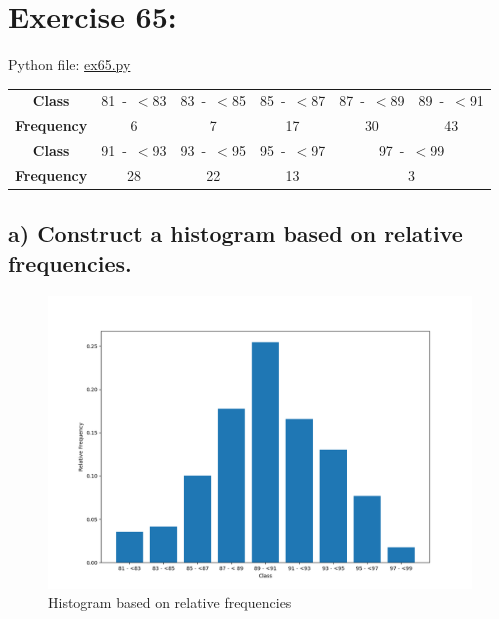 \newpage
\section{Exercise 65:}

Python file: \href{file:./python-scripts/ex65.py}{ex65.py}

\begin{table}[h!]
    \centering
    \begin{tabular}{cccccc}
        \textbf{Class}     & 81~-~\(<\)83 & 83~-~\(<\)85 & 85~-~\(<\)87 & 87~-~\(<\)89                     & 89~-~\(<\)91 \\
        \textbf{Frequency} & 6            & 7            & 17           & 30                               & 43           \\ \hline
        \textbf{Class}     & 91~-~\(<\)93 & 93~-~\(<\)95 & 95~-~\(<\)97 & \multicolumn{2}{c}{97~-~\(<\)99}                \\
        \textbf{Frequency} & 28           & 22           & 13           & \multicolumn{2}{c}{3}                           \\
    \end{tabular}
\end{table}


\subsection{a) Construct a histogram based on relative frequencies.}
\begin{figure}[h!]
    \centering
    \includegraphics[scale=0.5]{"img/hw1-2a.png"}
    \caption{Histogram based on relative frequencies}
    \label{fig:65a}
\end{figure}

